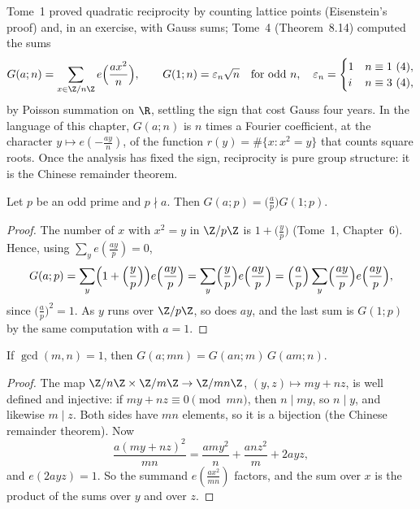 Tome~1 proved quadratic reciprocity by counting lattice points (Eisenstein's proof) and, in an exercise, with Gauss sums; Tome~4
(Theorem~8.14) computed the sums
\[G(a;n)=\sum_{x\in\Z/n\Z}e\Bigl(\frac{ax^2}n\Bigr),\qquad G(1;n)=\varepsilon_n\sqrt n\quad\text{for odd }n,\quad\varepsilon_n=\begin{cases}1&n\equiv1\ (4),\\i&n\equiv3\ (4),\end{cases}\]
by Poisson summation on $\R$, settling the sign that cost Gauss four years. In the language of this chapter, $G(a;n)$ is $n$ times a
Fourier coefficient, at the character $y\mapsto e(-\frac{ay}n)$, of the function $r(y)=\#\{x:x^2=y\}$ that counts square roots. Once the analysis has fixed
the sign, reciprocity is pure group structure: it is the Chinese remainder theorem.

\begin{lemma}\label{lem:gaussa}
Let $p$ be an odd prime and $p\nmid a$. Then $G(a;p)=\bigl(\frac ap\bigr)G(1;p)$.
\end{lemma}
\begin{proof}
The number of $x$ with $x^2=y$ in $\Z/p\Z$ is $1+\bigl(\frac yp\bigr)$ (Tome~1, Chapter~6). Hence, using $\sum_ye(\frac{ay}p)=0$,
\[G(a;p)=\sum_y\Bigl(1+\Bigl(\frac yp\Bigr)\Bigr)e\Bigl(\frac{ay}p\Bigr)=\sum_y\Bigl(\frac yp\Bigr)e\Bigl(\frac{ay}p\Bigr)=\Bigl(\frac ap\Bigr)\sum_y\Bigl(\frac{ay}p\Bigr)e\Bigl(\frac{ay}p\Bigr),\]
since $\bigl(\frac ap\bigr)^2=1$. As $y$ runs over $\Z/p\Z$, so does $ay$, and the last sum is $G(1;p)$ by the same computation with $a=1$.
\end{proof}

\begin{lemma}\label{lem:gaussmult}
If $\gcd(m,n)=1$, then $G(a;mn)=G(an;m)\,G(am;n)$.
\end{lemma}
\begin{proof}
The map $\Z/n\Z\times\Z/m\Z\to\Z/mn\Z$, $(y,z)\mapsto my+nz$, is well defined and injective: if $my+nz\equiv0\pmod{mn}$, then $n\mid my$, so
$n\mid y$, and likewise $m\mid z$. Both sides have $mn$ elements, so it is a bijection (the Chinese remainder theorem). Now
\[\frac{a(my+nz)^2}{mn}=\frac{amy^2}n+\frac{anz^2}m+2ayz,\]
and $e(2ayz)=1$. So the summand $e(\frac{ax^2}{mn})$ factors, and the sum over $x$ is the product of the sums over $y$ and over $z$.
\end{proof}

